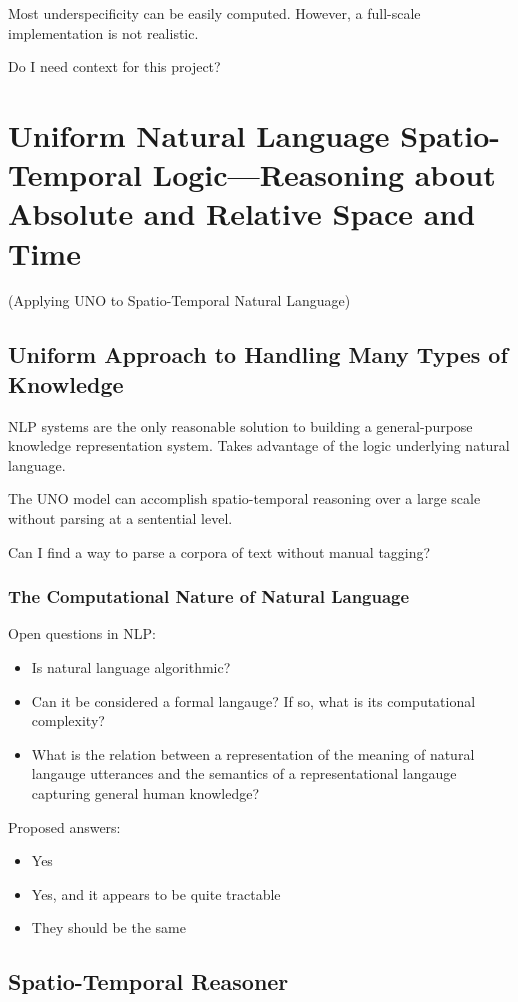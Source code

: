 \documentclass[11pt]{article}
\begin{document}
Most underspecificity can be easily computed.  However, a full-scale implementation is not realistic.  

Do I need context for this project?





\section{Uniform Natural Language Spatio-Temporal Logic---Reasoning about Absolute and Relative Space and Time}

(Applying UNO to Spatio-Temporal Natural Language)

\subsection{Uniform Approach to Handling Many Types of Knowledge}

NLP systems are the only reasonable solution to building a general-purpose knowledge representation system. Takes advantage of the logic underlying natural language.

The UNO model can accomplish spatio-temporal reasoning over a large scale without parsing at a sentential level.

Can I find a way to parse a corpora of text without manual tagging?

\subsubsection{The Computational Nature of Natural Language}
Open questions in NLP:
\begin{itemize}
\item Is natural language algorithmic?
\item Can it be considered a formal langauge?  If so, what is its computational complexity?
\item What is the relation between a representation of the meaning of natural langauge utterances and the semantics of a representational langauge capturing general human knowledge?
\end{itemize}

Proposed answers:
\begin{itemize}
\item Yes
\item Yes, and it appears to be quite tractable
\item They should be the same
\end{itemize}

\subsection{Spatio-Temporal Reasoner}
\end{document}
